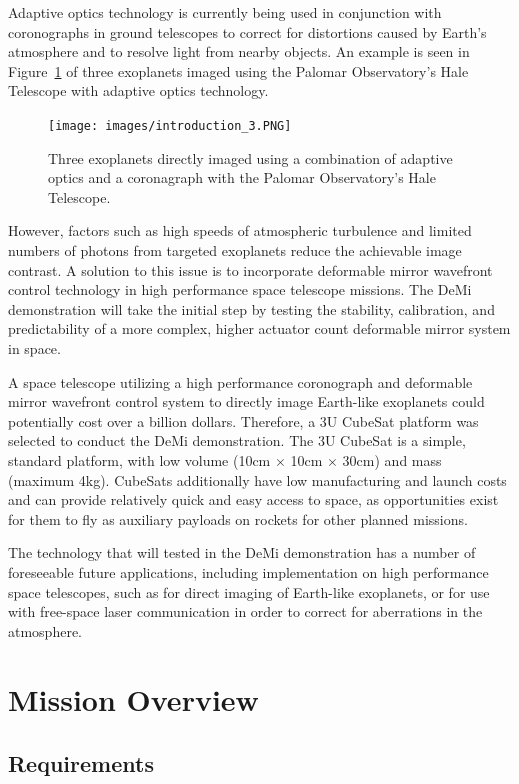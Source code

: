 \documentclass[12pt]{article}
\begin{document}
Adaptive optics technology is currently being used in conjunction with coronographs in ground telescopes to correct for distortions caused by Earth's atmosphere and to resolve light from nearby objects.  An example is seen in Figure~\ref{fig:Intro_exo} of three exoplanets imaged using the Palomar Observatory's Hale Telescope with adaptive optics technology. \cite{serabyn2010}


\begin{figure}[!ht]
\centering
\texttt{[image: images/introduction\_3.PNG]}
\caption{Three exoplanets directly imaged using a combination of adaptive optics and a coronagraph with the Palomar Observatory’s Hale Telescope.}
\label{fig:Intro_exo}
\end{figure}

However, factors such as high speeds of atmospheric turbulence and limited numbers of photons from targeted exoplanets reduce the achievable image contrast.  A solution to this issue is to incorporate deformable mirror wavefront control technology in high performance space telescope missions.  The DeMi demonstration will take the initial step by testing the stability, calibration, and predictability of a more complex, higher actuator count deformable mirror system in space.     

A space telescope utilizing a high performance coronograph and deformable mirror wavefront control system to directly image Earth-like exoplanets could potentially cost over a billion dollars.  Therefore, a 3U CubeSat platform was selected to conduct the DeMi demonstration.  The 3U CubeSat is a simple, standard platform, with low volume (10cm $\times$ 10cm $\times$ 30cm) and mass (maximum 4kg).   CubeSats additionally have low manufacturing and launch costs and can provide relatively quick and easy access to space, as opportunities exist for them to fly as auxiliary payloads on rockets for other planned missions. 

The technology that will tested in the DeMi demonstration has a number of foreseeable future applications, including implementation on high performance space telescopes, such as for direct imaging of Earth-like exoplanets, or for use with free-space laser communication in order to correct for aberrations in the atmosphere.\cite{cahoy-unpublished}

\section{Mission Overview}
		\subsection{Requirements}
		 
\end{document}
